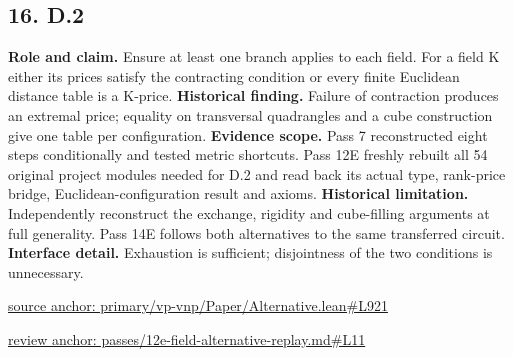 \documentclass[11pt,letterpaper]{article}
\theoremstyle{definition}\newtheorem{definition}[theorem]{Definition}\newtheorem{example}[theorem]{Example}
\theoremstyle{remark}\newtheorem{remark}[theorem]{Remark}
\begin{document}
\subsection*{16. D.2}
\textbf{Role and claim.} Ensure at least one branch applies to each field. For a field K either its prices satisfy the contracting condition or every finite Euclidean distance table is a K-price.
\textbf{Historical finding.} Failure of contraction produces an extremal price; equality on transversal quadrangles and a cube construction give one table per configuration.
\textbf{Evidence scope.} Pass 7 reconstructed eight steps conditionally and tested metric shortcuts. Pass 12E freshly rebuilt all 54 original project modules needed for D.2 and read back its actual type, rank-price bridge, Euclidean-configuration result and axioms.
\textbf{Historical limitation.} Independently reconstruct the exchange, rigidity and cube-filling arguments at full generality. Pass 14E follows both alternatives to the same transferred circuit.
\textbf{Interface detail.} Exhaustion is sufficient; disjointness of the two conditions is unnecessary.
\par\href{https://github.com/nousentllc/VP-VNP-Review/blob/8a7976933b6b2b4ffda1ad3a0dfb5fc6b6f023e8/primary/vp-vnp/Paper/Alternative.lean\#L921}{source anchor: primary/vp-vnp/Paper/Alternative.lean\#L921}
\par\href{https://github.com/nousentllc/VP-VNP-Review/blob/8a7976933b6b2b4ffda1ad3a0dfb5fc6b6f023e8/passes/12e-field-alternative-replay.md\#L11}{review anchor: passes/12e-field-alternative-replay.md\#L11}
\goodbreak
{}
\hypertarget{claim.17}{}
\end{document}
